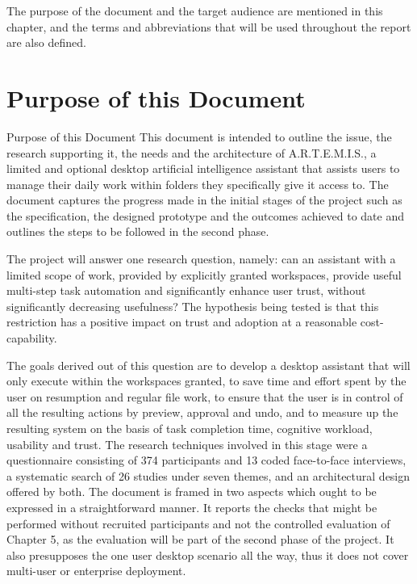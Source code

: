 \documentclass{FastFyp}
\begin{document}
The purpose of the document and the target audience are mentioned in this chapter, and the terms and abbreviations that will be used throughout the report are also defined.

\section{Purpose of this Document}
Purpose of this Document This document is intended to outline the issue, the research supporting it, the needs and the architecture of A.R.T.E.M.I.S., a limited and optional desktop artificial intelligence assistant that assists users to manage their daily work within folders they specifically give it access to. The document captures the progress made in the initial stages of the project such as the specification, the designed prototype and the outcomes achieved to date and outlines the steps to be followed in the second phase.

The project will answer one research question, namely: can an assistant with a limited scope of work, provided by explicitly granted workspaces, provide useful multi-step task automation and significantly enhance user trust, without significantly decreasing usefulness? The hypothesis being tested is that this restriction has a positive impact on trust and adoption at a reasonable cost-capability.

The goals derived out of this question are to develop a desktop assistant that will only execute within the workspaces granted, to save time and effort spent by the user on resumption and regular file work, to ensure that the user is in control of all the resulting actions by preview, approval and undo, and to measure up the resulting system on the basis of task completion time, cognitive workload, usability and trust. The research techniques involved in this stage were a questionnaire consisting of 374 participants and 13 coded face-to-face interviews, a systematic search of 26 studies under seven themes, and an architectural design offered by both. The document is framed in two aspects which ought to be expressed in a straightforward manner. It reports the checks that might be performed without recruited participants and not the controlled evaluation of Chapter 5, as the evaluation will be part of the second phase of the project. It also presupposes the one user desktop scenario all the way, thus it does not cover multi-user or enterprise deployment.
\end{document}
